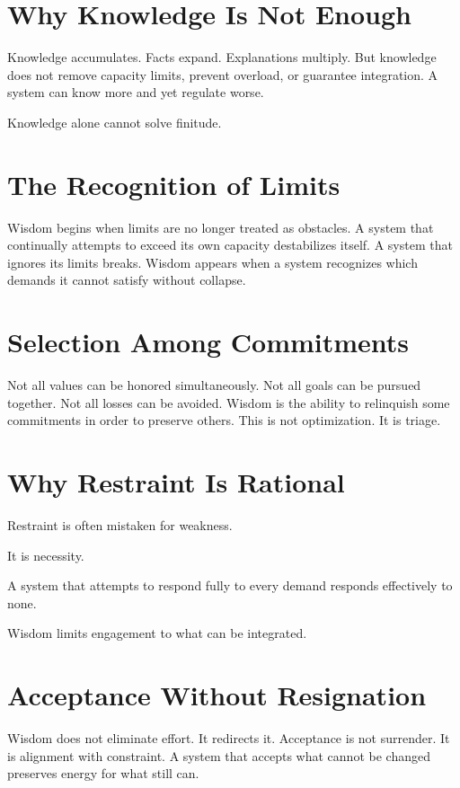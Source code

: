 \documentclass[11pt,twoside,openright]{book}
\begin{document}
\section*{Why Knowledge Is Not Enough}

Knowledge accumulates. Facts expand. Explanations multiply. But knowledge does not remove capacity limits, prevent overload, or guarantee integration. A system can know more and yet regulate worse.

Knowledge alone cannot solve finitude.

\section*{The Recognition of Limits}

Wisdom begins when limits are no longer treated as obstacles. A system that continually attempts to exceed its own capacity destabilizes itself. A system that ignores its limits breaks. Wisdom appears when a system recognizes which demands it cannot satisfy without collapse.

\section*{Selection Among Commitments}

Not all values can be honored simultaneously. Not all goals can be pursued together. Not all losses can be avoided. Wisdom is the ability to relinquish some commitments in order to preserve others. This is not optimization. It is triage.

\section*{Why Restraint Is Rational}

Restraint is often mistaken for weakness.

It is necessity.

A system that attempts to respond fully to every demand responds effectively to none.

Wisdom limits engagement to what can be integrated.

\section*{Acceptance Without Resignation}

Wisdom does not eliminate effort. It redirects it. Acceptance is not surrender. It is alignment with constraint. A system that accepts what cannot be changed preserves energy for what still can.
\end{document}
